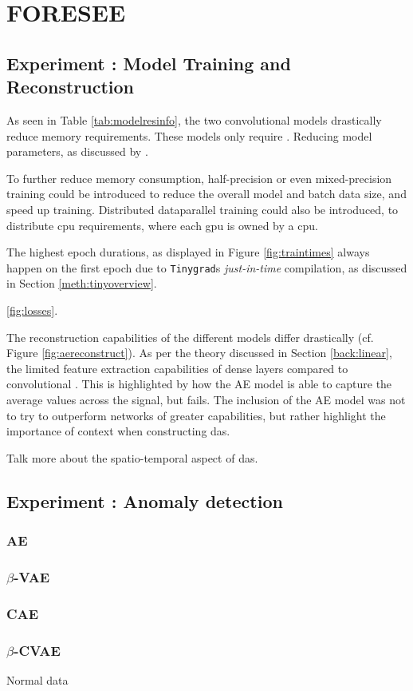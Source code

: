 \section{FORESEE}
\label{disc:foresee}

\subsection{Experiment : Model Training and Reconstruction}

As seen in Table \ref{tab:modelresinfo}, the two convolutional models drastically reduce memory requirements. These models only require . 
Reducing model parameters, as discussed by \cite{s23021009} . 

To further reduce memory consumption, half-precision or even mixed-precision training could be introduced to reduce the overall model and batch data size, and speed up training. Distributed dataparallel training could also be introduced, to distribute \acrshort{cpu} requirements, where each \acrshort{gpu} is owned by a \acrshort{cpu}.

The highest epoch durations, as displayed in Figure \ref{fig:traintimes} always happen on the first epoch due to \texttt{Tinygrad}s \textit{just-in-time} compilation, as discussed in Section \ref{meth:tinyoverview}. 


\ref{fig:losses}. 
      
The reconstruction capabilities of the different models differ drastically (cf. Figure \ref{fig:aereconstruct}). As per the theory discussed in Section \ref{back:linear}, the limited feature extraction capabilities of dense layers compared to convolutional . This is highlighted by how the AE model is able to capture the average values across the signal, but fails. The inclusion of the AE model was not to try to outperform networks of greater capabilities, but rather highlight the importance of  context when constructing \acrshort{das}. 

Talk more about the spatio-temporal aspect of \acrshort{das}.



\subsection{Experiment : Anomaly detection}

\subsubsection{AE}
\subsubsection{$\beta$-VAE}
\subsubsection{CAE}
\subsubsection{$\beta$-CVAE}


Normal data 

